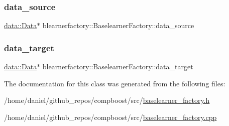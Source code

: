 \mbox{\label{classblearnerfactory_1_1_baselearner_factory_a6194191695958b4035d3ea0841c2320c}} 
\subsubsection{\texorpdfstring{data\+\_\+source}{data\_source}}
{\footnotesize\ttfamily \hyperlink{classdata_1_1_data}{data\+::\+Data}$\ast$ blearnerfactory\+::\+Baselearner\+Factory\+::data\+\_\+source\hspace{0.3cm}{\ttfamily [protected]}}

\mbox{\label{classblearnerfactory_1_1_baselearner_factory_af2cb5c226c90469c6a70b677214ecc2f}} 
\subsubsection{\texorpdfstring{data\+\_\+target}{data\_target}}
{\footnotesize\ttfamily \hyperlink{classdata_1_1_data}{data\+::\+Data}$\ast$ blearnerfactory\+::\+Baselearner\+Factory\+::data\+\_\+target\hspace{0.3cm}{\ttfamily [protected]}}



The documentation for this class was generated from the following files\+:\begin{DoxyCompactItemize}
\item 
/home/daniel/github\+\_\+repos/compboost/src/\hyperlink{baselearner__factory_8h}{baselearner\+\_\+factory.\+h}\item 
/home/daniel/github\+\_\+repos/compboost/src/\hyperlink{baselearner__factory_8cpp}{baselearner\+\_\+factory.\+cpp}\end{DoxyCompactItemize}
